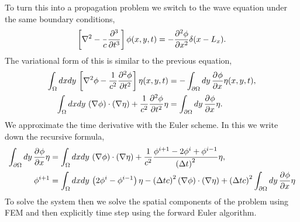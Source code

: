 \documentclass{article}
\begin{document}
To turn this into a propagation problem we switch to the wave equation under the same boundary conditions,
\begin{equation*}
  \left[\nabla^2-\frac{}{c}\pdv[3]{}{t}\right]\phi(x,y,t)=-\pdv[2]{\phi}{x}\delta(x-L_x).
\end{equation*}
The variational form of this is similar to the previous equation,
\begin{align*}
  \int_{\Omega}dxdy\,\left[\nabla^2\phi-\frac{1}{c^2}\pdv[2]{\phi}{t}\right]\eta(x,y,t)&=-\int_{\partial\Omega}dy\,\pdv[]{\phi}{x}\eta(x,y,t),\\
  \int_{\Omega}dxdy\,\left(\nabla\phi\right)\cdot\left(\nabla\eta\right)+\frac{1}{c^2}\pdv[2]{\phi}{t}\eta&=\int_{\partial\Omega}dy\,\pdv[]{\phi}{x}\eta.
\end{align*}
We approximate the time derivative with the Euler scheme. In this we write down the recursive formula,
\begin{align*}
  \int_{\partial\Omega}dy\,\pdv[]{\phi}{x}\eta&=\int_{\Omega}dxdy\,\left(\nabla\phi\right)\cdot\left(\nabla\eta\right)+\frac{1}{c^2}\frac{\phi^{i+1}-2\phi^{i}+\phi^{i-1}}{\left(\Delta t\right)^2}\eta,\\
  \phi^{i+1}&=\int_{\Omega}dxdy\,\left(2\phi^i-\phi^{i-1}\right)\eta-\left(\Delta tc\right)^2\left(\nabla\phi\right)\cdot\left(\nabla\eta\right)+\left(\Delta tc\right)^2\int_{\partial\Omega}dy\,\pdv[]{\phi}{x}\eta
\end{align*}
To solve the system then we solve the spatial components of the problem using FEM and then explicitly time step using the forward Euler algorithm.
\end{document}
